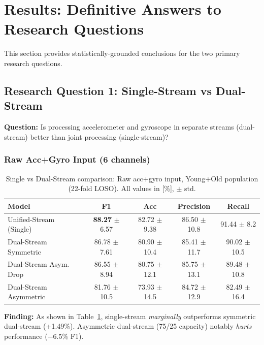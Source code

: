 \documentclass{article}
\begin{document}
\section{Results: Definitive Answers to Research Questions}
\label{sec:results_rq}

This section provides statistically-grounded conclusions for the two primary research questions.

\subsection{Research Question 1: Single-Stream vs Dual-Stream}

\textbf{Question:} Is processing accelerometer and gyroscope in separate streams (dual-stream) better than joint processing (single-stream)?

\subsubsection{Raw Acc+Gyro Input (6 channels)}

\begin{table}[htbp]
    \centering
    \caption{Single vs Dual-Stream comparison: Raw acc+gyro input, Young+Old population (22-fold LOSO). All values in [\%], $\pm$ std.}
    \label{tab:rq1_raw}
    \begin{tabular}{lcccc}
        \toprule
        \textbf{Model} & \textbf{F1} & \textbf{Acc} & \textbf{Precision} & \textbf{Recall} \\
        \midrule
        Unified-Stream (Single) & \textbf{88.27} $\pm$ 6.57 & 82.72 $\pm$ 9.38 & 86.50 $\pm$ 10.8 & 91.44 $\pm$ 8.2 \\
        Dual-Stream Symmetric & 86.78 $\pm$ 7.61 & 80.90 $\pm$ 10.4 & 85.41 $\pm$ 11.7 & 90.02 $\pm$ 10.5 \\
        Dual-Stream Asym. Drop & 86.55 $\pm$ 8.94 & 80.75 $\pm$ 12.1 & 85.75 $\pm$ 13.1 & 89.48 $\pm$ 10.8 \\
        Dual-Stream Asymmetric & 81.76 $\pm$ 10.5 & 73.93 $\pm$ 14.5 & 84.72 $\pm$ 12.9 & 82.49 $\pm$ 16.4 \\
        \bottomrule
    \end{tabular}
\end{table}

\textbf{Finding:} As shown in Table~\ref{tab:rq1_raw}, single-stream \textit{marginally} outperforms symmetric dual-stream (+1.49\%). Asymmetric dual-stream (75/25 capacity) notably \textit{hurts} performance ($-6.5$\% F1).
\end{document}
